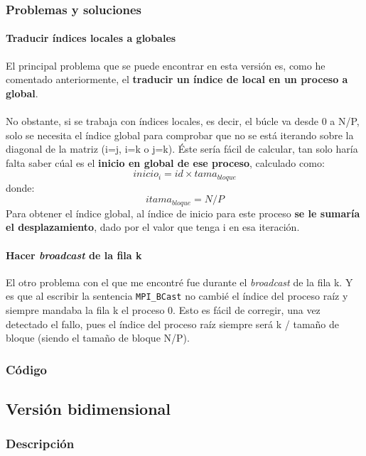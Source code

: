 \subsubsection{Problemas y soluciones}

\paragraph{Traducir índices locales a globales}

El principal problema que se puede encontrar en esta versión es, como he comentado anteriormente, el \textbf{traducir un índice de local en un proceso a global}.
\\ \\
No obstante, si se trabaja con índices locales, es decir, el búcle va desde 0 a N/P, solo se necesita el índice global para comprobar que no se está iterando sobre la diagonal de la matriz (i=j, i=k o j=k). Éste sería fácil de calcular, tan solo haría falta saber cúal es el \textbf{inicio en global de ese proceso}, calculado como:
\[ inicio_i = id \times tama_{bloque}  \]
donde:
\[ itama_{bloque} = N / P  \]
Para obtener el índice global, al índice de inicio para este proceso \textbf{se le sumaría el desplazamiento}, dado por el valor que tenga i en esa iteración.

\paragraph{Hacer \textit{broadcast} de la fila k}

El otro problema con el que me encontré fue durante el \textit{broadcast} de la fila k. Y es que al escribir la sentencia \texttt{MPI\_BCast} no cambié el índice del proceso raíz y siempre mandaba la fila k el proceso 0. Esto es fácil de corregir, una vez detectado el fallo, pues el índice del proceso raíz siempre será k / tamaño de bloque (siendo el tamaño de bloque N/P).

\subsubsection{Código}



\subsection{Versión bidimensional}

\subsubsection{Descripción}


